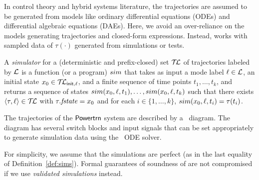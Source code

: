 %
In control theory and hybrid systems literature, the trajectories are
assumed to be generated from models like ordinary differential
equations (ODEs) and differential algebraic equations (DAEs). Here,
we avoid an over-reliance on the models generating trajectories and
closed-form expressions. Instead, {\toolname} works with sampled data
of $\tau(\cdot)$ generated from simulations or tests.
	
\begin{definition}
	\label{def:sims}
A {\em simulator\/} for a (deterministic and prefix-closed) set $\mathcal{T\mkern-3mu L}$
of trajectories labeled by ${\mathcal L}$ is a function (or a program)
${\sc sim}$ that takes as input a mode label $\ell \in {\mathcal L}$, an
initial state $x_0 \in \mathcal{T\mkern-3mu L}_{\sf init,\ell}$, and a finite
sequence of time points $t_1, \ldots, t_k$, and returns a sequence of
states ${\sc sim}(x_0,\ell,t_1), \ldots, {\sc sim}(x_0,\ell, t_k)$
such that there exists $\langle\tau,\ell\rangle \in \mathcal{T\mkern-3mu L}$ with
$\tau.\mathit{fstate} = x_0$ and for each $i\in \{1,\ldots, k\}$,
${\sc sim}(x_0,\ell,t_i) = \tau(t_i)$.
\end{definition}

The trajectories of the ${\operatorname{\mathsf{Powertrn}}}$ system are described by a \Simulink\ diagram.
%
The diagram has several switch blocks and input signals  that can be set appropriately to generate simulation data using the \Simulink\ ODE solver.

%
For simplicity, we assume that the simulations are perfect (as in the
last equality of Definition~\ref{def:sims}). Formal guarantees of
soundness of {\toolname} are not compromised if we use \emph{validated
  simulations} instead.
	




\vspace{-10pt}
